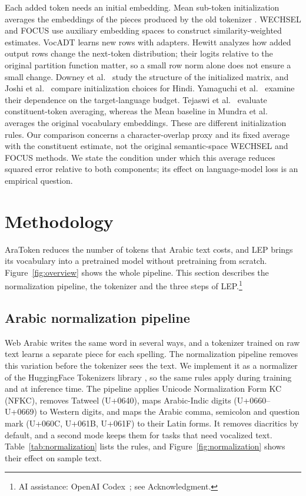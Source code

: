 \documentclass{ieeeaccess}
\begin{document}
Each added token needs an initial embedding. Mean sub-token initialization
averages the embeddings of the pieces produced by the old tokenizer
\cite{tejaswi2024design}. WECHSEL \cite{minixhofer2022wechsel} and FOCUS
\cite{dobler2023focus} use auxiliary embedding spaces to construct
similarity-weighted estimates. VocADT \cite{han_vocadt_2025} learns new rows
with adapters. Hewitt \cite{hewitt2021initializing} analyzes how added output
rows change the next-token distribution; their logits relative to the
original partition function matter, so a small row norm alone does not
ensure a small change. Downey et al.\ \cite{downey2023embedding} study the
structure of the initialized matrix, and Joshi et al.\
\cite{joshi2026beyond} compare initialization choices for Hindi.
Yamaguchi et al.\ \cite{yamaguchi2026expand} examine their dependence on the
target-language budget. Tejaswi et al.\ \cite{tejaswi2024design} evaluate
constituent-token averaging, whereas the Mean baseline in Mundra et al.\
\cite{mundra2024empirical} averages the original vocabulary embeddings.
These are different initialization rules. Our comparison concerns a
character-overlap proxy and its fixed average with the constituent estimate,
not the original semantic-space WECHSEL and FOCUS methods. We state the
condition under which this average reduces squared error relative to both
components; its effect on language-model loss is an empirical question.

\section{Methodology}
\label{sec:methodology}

AraToken reduces the number of tokens that Arabic text costs, and LEP brings
its vocabulary into a pretrained model without pretraining from scratch.
Figure~\ref{fig:overview} shows the whole pipeline. This section describes
the normalization pipeline, the tokenizer and the three steps of LEP.\footnote{AI assistance: OpenAI Codex~\cite{openaicodex2026}; see Acknowledgment.}

\subsection{Arabic normalization pipeline}
\label{sec:normalization}

Web Arabic writes the same word in several ways, and a tokenizer trained on
raw text learns a separate piece for each spelling. The normalization
pipeline removes this variation before the tokenizer sees the text. We
implement it as a normalizer of the HuggingFace Tokenizers library
\cite{moi2023tokenizers}, so the same rules apply during training and at
inference time. The pipeline applies Unicode Normalization Form KC (NFKC), removes Tatweel
(U+0640), maps Arabic-Indic digits (U+0660--U+0669) to Western digits, and
maps the Arabic comma, semicolon and question mark (U+060C, U+061B, U+061F)
to their Latin forms. It removes diacritics by default, and a second mode
keeps them for tasks that need vocalized text. Table~\ref{tab:normalization}
lists the rules, and Figure~\ref{fig:normalization} shows their effect on
sample text.
\end{document}
